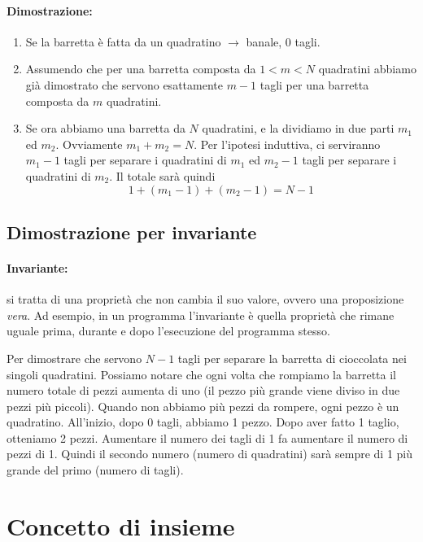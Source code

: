 \documentclass[a4paper,12pt]{report}
\begin{document}
\paragraph{Dimostrazione:}

\begin{enumerate}
\item Se la barretta \`{e} fatta da un quadratino $\rightarrow$ banale, 0 tagli.
\item Assumendo che per una barretta composta da $1 < m < N$ quadratini abbiamo gi\`{a} dimostrato che servono esattamente $m - 1$ tagli per una barretta composta da $m$ quadratini. 
\item Se ora abbiamo una barretta da $N$ quadratini, e la dividiamo in due parti $m_1$ ed $m_2$. Ovviamente $m_1 + m_2 = N$. Per l'ipotesi induttiva, ci serviranno $m_1 - 1$ tagli per separare i quadratini di $m_1$ ed $m_2 - 1$ tagli per separare i quadratini di $m_2$. Il totale sar\`{a} quindi \[1 + (m_1 - 1) + (m_2 -1) = N - 1\]
\end{enumerate}

\subsection{Dimostrazione per invariante}
\paragraph{Invariante:} si tratta di una propriet\`{a} che non cambia il suo valore, ovvero una proposizione \emph{vera}. Ad esempio, in un programma l'invariante \`{e} quella propriet\`{a} che rimane uguale prima, durante e dopo l'esecuzione del programma stesso.
\newline

Per dimostrare che servono $N-1$ tagli per separare la barretta di cioccolata nei singoli quadratini. Possiamo notare che ogni volta che rompiamo la barretta il numero totale di pezzi aumenta di uno (il pezzo pi\`{u} grande viene diviso in due pezzi pi\`{u} piccoli). Quando non abbiamo pi\`{u} pezzi da rompere, ogni pezzo \`{e} un quadratino. All'inizio, dopo 0 tagli, abbiamo 1 pezzo. Dopo aver fatto 1 taglio, otteniamo 2 pezzi. Aumentare il numero dei tagli di 1 fa aumentare il numero di pezzi di 1. Quindi il secondo numero (numero di quadratini) sar\`{a} sempre di 1 pi\`{u} grande del primo (numero di tagli).

\section{Concetto di insieme}
\end{document}
